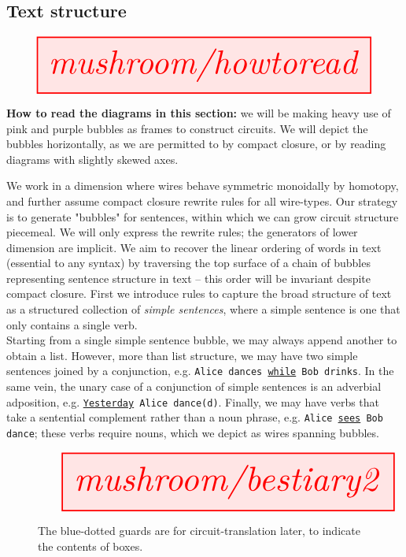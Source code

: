 \clearpage

\subsection{Text structure}

\begin{marginfigure}
\centering
\[
\resizebox{\textwidth}{!}{\tikzfig{mushroom/howtoread}}
\]
\caption{\textbf{How to read the diagrams in this section:} we will be making heavy use of pink and purple bubbles as frames to construct circuits. We will depict the bubbles horizontally, as we are permitted to by compact closure, or by reading diagrams with slightly skewed axes.}
\end{marginfigure}

We work in a dimension where wires behave symmetric monoidally by homotopy, and further assume compact closure rewrite rules for all wire-types. Our strategy is to generate "bubbles" for sentences, within which we can grow circuit structure piecemeal. We will only express the rewrite rules; the generators of lower dimension are implicit. We aim to recover the linear ordering of words in text (essential to any syntax) by traversing the top surface of a chain of bubbles representing sentence structure in text -- this order will be invariant despite compact closure. First we introduce rules to capture the broad structure of text as a structured collection of \emph{simple sentences}, where a simple sentence is one that only contains a single verb.\\

Starting from a single simple sentence bubble, we may always append another to obtain a list. However, more than list structure, we may have two simple sentences joined by a conjunction, e.g. \texttt{Alice dances \underline{while} Bob drinks}. In the same vein, the unary case of a conjunction of simple sentences is an adverbial adposition, e.g. \texttt{\underline{Yesterday} Alice dance(d)}. Finally, we may have verbs that take a sentential complement rather than a noun phrase, e.g. \texttt{Alice \underline{sees} Bob dance}; these verbs require nouns, which we depict as wires spanning bubbles.

\begin{figure}[h!]\label{fig:sentbestiary}
\centering
\[
\resizebox{\textwidth}{!}{\tikzfig{mushroom/bestiary2}}
\]
\caption{The blue-dotted guards are for circuit-translation later, to indicate the contents of boxes.}
\end{figure}

